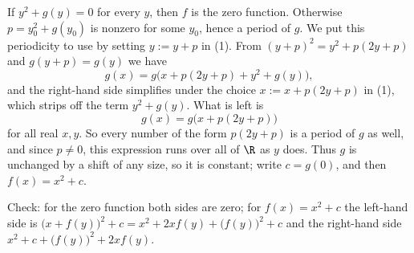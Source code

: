 {    If $y^2+g(y)=0$ for every $y$, then $f$ is the zero function. Otherwise $p=y_0^2+g(y_0)$ is nonzero for some $y_0$, hence a period of $g$. We put this periodicity to use by setting $y:=y+p$ in (1). From $(y+p)^2=y^2+p(2y+p)$ and $g(y+p)=g(y)$ we have
    $$
    g(x) = g\bigl(x+p(2y+p)+y^2+g(y)\bigr),
    $$
    and the right-hand side simplifies under the choice $x:=x+p(2y+p)$ in (1), which strips off the term $y^2+g(y)$. What is left is
    $$
    g(x) = g\bigl(x+p(2y+p)\bigr)
    $$
    for all real $x,y$. So every number of the form $p(2y+p)$ is a period of $g$ as well, and since $p\neq0$, this expression runs over all of $\R$ as $y$ does. Thus $g$ is unchanged by a shift of any size, so it is constant; write $c=g(0)$, and then $f(x)=x^2+c$.

    Check: for the zero function both sides are zero; for $f(x)=x^2+c$ the left-hand side is $\bigl(x+f(y)\bigr)^2+c=x^2+2xf(y)+\bigl(f(y)\bigr)^2+c$ and the right-hand side $x^2+c+\bigl(f(y)\bigr)^2+2xf(y)$.
}

